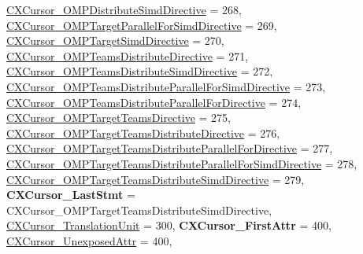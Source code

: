 \begin{DoxyCompactItemize}
\hyperlink{group__CINDEX_ggaaccc432245b4cd9f2d470913f9ef0013ae5df040bf2d9a2a0dfc9bbaab6c6a8fe}{C\+X\+Cursor\+\_\+\+O\+M\+P\+Distribute\+Simd\+Directive} = 268, 
\hyperlink{group__CINDEX_ggaaccc432245b4cd9f2d470913f9ef0013a2fd50625c4b1d5134e9236326ae129ac}{C\+X\+Cursor\+\_\+\+O\+M\+P\+Target\+Parallel\+For\+Simd\+Directive} = 269, 
\hyperlink{group__CINDEX_ggaaccc432245b4cd9f2d470913f9ef0013a3111605e87d2c0efd607c59ee3a62e60}{C\+X\+Cursor\+\_\+\+O\+M\+P\+Target\+Simd\+Directive} = 270, 
\newline
\hyperlink{group__CINDEX_ggaaccc432245b4cd9f2d470913f9ef0013a282658567d279956b63957f942fc4d50}{C\+X\+Cursor\+\_\+\+O\+M\+P\+Teams\+Distribute\+Directive} = 271, 
\hyperlink{group__CINDEX_ggaaccc432245b4cd9f2d470913f9ef0013a44d228ef5c0dbe5d97c41938ec00fba5}{C\+X\+Cursor\+\_\+\+O\+M\+P\+Teams\+Distribute\+Simd\+Directive} = 272, 
\hyperlink{group__CINDEX_ggaaccc432245b4cd9f2d470913f9ef0013a3869e8f3e994c8cce00f66c440c5e220}{C\+X\+Cursor\+\_\+\+O\+M\+P\+Teams\+Distribute\+Parallel\+For\+Simd\+Directive} = 273, 
\hyperlink{group__CINDEX_ggaaccc432245b4cd9f2d470913f9ef0013a5b9a6e448ef56398fa32733b8d044d1c}{C\+X\+Cursor\+\_\+\+O\+M\+P\+Teams\+Distribute\+Parallel\+For\+Directive} = 274, 
\newline
\hyperlink{group__CINDEX_ggaaccc432245b4cd9f2d470913f9ef0013a79d875e2226f195bcd9054bdb00531a7}{C\+X\+Cursor\+\_\+\+O\+M\+P\+Target\+Teams\+Directive} = 275, 
\hyperlink{group__CINDEX_ggaaccc432245b4cd9f2d470913f9ef0013a440c353a2ae2c6b9473ffce853e42960}{C\+X\+Cursor\+\_\+\+O\+M\+P\+Target\+Teams\+Distribute\+Directive} = 276, 
\hyperlink{group__CINDEX_ggaaccc432245b4cd9f2d470913f9ef0013ace298c5819d3f70bb479c347a7f9fbd3}{C\+X\+Cursor\+\_\+\+O\+M\+P\+Target\+Teams\+Distribute\+Parallel\+For\+Directive} = 277, 
\hyperlink{group__CINDEX_ggaaccc432245b4cd9f2d470913f9ef0013aff552b0c2bb6bc16b8c1414e35a714f7}{C\+X\+Cursor\+\_\+\+O\+M\+P\+Target\+Teams\+Distribute\+Parallel\+For\+Simd\+Directive} = 278, 
\newline
\hyperlink{group__CINDEX_ggaaccc432245b4cd9f2d470913f9ef0013a1f1a5157898609387a7b5c1085bfb202}{C\+X\+Cursor\+\_\+\+O\+M\+P\+Target\+Teams\+Distribute\+Simd\+Directive} = 279, 
{\bfseries C\+X\+Cursor\+\_\+\+Last\+Stmt} = C\+X\+Cursor\+\_\+\+O\+M\+P\+Target\+Teams\+Distribute\+Simd\+Directive, 
\hyperlink{group__CINDEX_ggaaccc432245b4cd9f2d470913f9ef0013a7b14cc488d53714c4a6ecaa58b0af066}{C\+X\+Cursor\+\_\+\+Translation\+Unit} = 300, 
{\bfseries C\+X\+Cursor\+\_\+\+First\+Attr} = 400, 
\newline
\hyperlink{group__CINDEX_ggaaccc432245b4cd9f2d470913f9ef0013a56b1a578c3f15052f83d0c316ed1d4bf}{C\+X\+Cursor\+\_\+\+Unexposed\+Attr} = 400, 

\end{DoxyCompactItemize}
